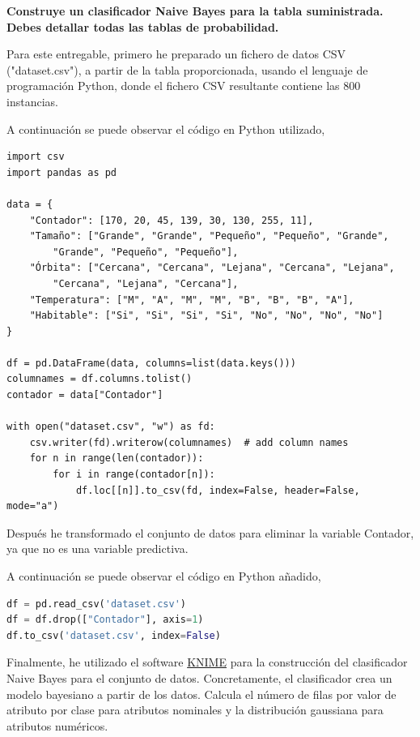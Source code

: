\documentclass[11pt]{exam}
\begin{document}
\begin{questions}
	
{\bf \question Construye un clasificador Naive Bayes para la tabla suministrada. Debes detallar todas las tablas de probabilidad.}

Para este entregable, primero he preparado un fichero de datos CSV ("dataset.csv"), a partir de la tabla proporcionada, usando el lenguaje de programación Python, donde el fichero CSV resultante contiene las 800 instancias.

A continuación se puede observar el código en Python utilizado,

\newpage

\begin{lstlisting}[basicstyle=\small, tabsize=2]
import csv
import pandas as pd

data = {
	"Contador": [170, 20, 45, 139, 30, 130, 255, 11],
	"Tamaño": ["Grande", "Grande", "Pequeño", "Pequeño", "Grande", 
		"Grande", "Pequeño", "Pequeño"],
	"Órbita": ["Cercana", "Cercana", "Lejana", "Cercana", "Lejana", 
		"Cercana", "Lejana", "Cercana"],
	"Temperatura": ["M", "A", "M", "M", "B", "B", "B", "A"],
	"Habitable": ["Si", "Si", "Si", "Si", "No", "No", "No", "No"]
}

df = pd.DataFrame(data, columns=list(data.keys()))
columnames = df.columns.tolist()
contador = data["Contador"]

with open("dataset.csv", "w") as fd:
	csv.writer(fd).writerow(columnames)  # add column names
	for n in range(len(contador)):
		for i in range(contador[n]):
			df.loc[[n]].to_csv(fd, index=False, header=False, mode="a")
\end{lstlisting}

Después he transformado el conjunto de datos para eliminar la variable Contador, ya que no es una variable predictiva.

A continuación se puede observar el código en Python añadido,

\begin{lstlisting}[language=Python, basicstyle=\small, tabsize=2]
df = pd.read_csv('dataset.csv')
df = df.drop(["Contador"], axis=1)
df.to_csv('dataset.csv', index=False)
\end{lstlisting}

Finalmente, he utilizado el software \href{https://www.knime.com/}{KNIME} para la construcción del clasificador Naive Bayes para el conjunto de datos. Concretamente, el clasificador crea un modelo bayesiano a partir de los datos. Calcula el número de filas por valor de atributo por clase para atributos nominales y la distribución gaussiana para atributos numéricos. 


\end{questions}
\end{document}
